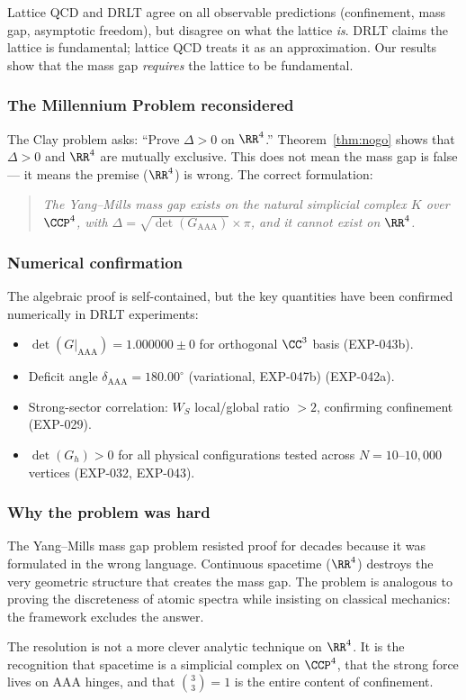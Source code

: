 \noindent
Lattice QCD and DRLT agree on all observable predictions (confinement,
mass gap, asymptotic freedom), but disagree on what the lattice \emph{is}.
DRLT claims the lattice is fundamental; lattice QCD treats it as an
approximation. Our results show that the mass gap \emph{requires}
the lattice to be fundamental.

\subsubsection{The Millennium Problem reconsidered}

The Clay problem asks: ``Prove $\Delta > 0$ on $\RR^4$.''
Theorem~\ref{thm:nogo} shows that $\Delta > 0$ and $\RR^4$ are
mutually exclusive. This does not mean the mass gap is false --- it
means the premise ($\RR^4$) is wrong. The correct formulation:

\begin{quote}
\emph{The Yang--Mills mass gap exists on the natural simplicial complex
$K$ over $\CCP^4$, with $\Delta = \sqrt{\det(G_{\mathrm{AAA}})}
\times \pi$, and it cannot exist on $\RR^4$.}
\end{quote}

\subsubsection{Numerical confirmation}

The algebraic proof is self-contained, but the key quantities have been
confirmed numerically in DRLT experiments:

\begin{itemize}
\item $\det(G|_{\mathrm{AAA}}) = 1.000000 \pm 0$ for orthogonal
  $\CC^3$ basis (EXP-043b).
\item Deficit angle $\delta_{\mathrm{AAA}} = 180.00^\circ$ (variational, EXP-047b)
  (EXP-042a).
\item Strong-sector correlation: $W_S$ local/global ratio $> 2$,
  confirming confinement (EXP-029).
\item $\det(G_h) > 0$ for all physical configurations tested across
  $N = 10$--$10{,}000$ vertices (EXP-032, EXP-043).
\end{itemize}

\subsubsection{Why the problem was hard}

The Yang--Mills mass gap problem resisted proof for decades because it
was formulated in the wrong language. Continuous spacetime
($\RR^4$) destroys the very geometric structure that creates the
mass gap. The problem is analogous to proving the discreteness of atomic
spectra while insisting on classical mechanics: the framework excludes
the answer.

The resolution is not a more clever analytic technique on $\RR^4$.
It is the recognition that spacetime is a simplicial complex on
$\CCP^4$, that the strong force lives on AAA hinges, and that
$\binom{3}{3} = 1$ is the entire content of confinement.
